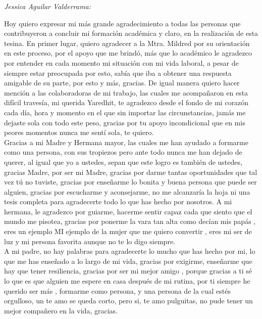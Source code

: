 \documentclass[12pt,letterpaper,spanish, xcolor=table]{report}
\numberwithin{figure}{subsection}
\newenvironment{dedication}{\newpage\large\null\em\vskip1in}%
{\vfill}
\begin{document}
		\begin{dedication}
			Jessica Aguilar Valderrama:
			
			Hoy quiero expresar mi más grande agradecimiento a todas las personas que contribuyeron a concluir mi formación académica y claro, en la realización de esta tesina. En primer lugar, quiero agradecer a la Mtra. Mildred por su orientación en este proceso, por el apoyo que me brindó, más que lo académico le agradezco por entender en cada momento mi situación con mi vida laboral, a pesar de siempre estar preocupada por esto, sabía que iba a obtener una respuesta amigable de su parte, por esto y más, gracias. De igual manera quiero hacer mención a las colaboradoras de mi trabajo, las cuales me acompañaron en esta difícil travesía, mi querida Yaredhit, te agradezco desde el fondo de mi corazón cada día, hora y momento en el que sin importar las circunstancias, jamás me dejaste sola con todo este peso, gracias por tu apoyo incondicional que en mis peores momentos nunca me sentí sola, te quiero.\\
			
			Gracias a mi Madre y Hermana mayor, las cuales me han ayudado a formarme como una persona, con sus tropiezos pero ante todo nunca me han dejado de querer, al igual que yo a ustedes, sepan que este logro es también de ustedes, gracias Madre, por ser mi Madre, gracias por darme tantas oportunidades que tal vez tú no tuviste, gracias por enseñarme lo bonita y buena persona que puede ser alguien, gracias por escucharme y aconsejarme, no me alcanzaría la hoja ni una tesis completa para agradecerte todo lo que has hecho por nosotros. A mi hermana, le agradezco por guiarme, hacerme sentir capaz cada que siento que el mundo me pisotea, gracias por ponerme la vara tan alta como decían mis papás , eres un ejemplo MI ejemplo de la mujer que me quiero convertir , eres mi ser de luz y mi persona favorita aunque no te lo digo siempre.\\
			
			A mi padre, no hay palabras para agradecerte lo mucho que has hecho por mi, lo que me has enseñado a lo largo de mi vida, gracias por exigirme, enseñarme que hay que tener resiliencia, gracias por ser mi mejor amigo , porque gracias a ti sé lo que es que alguien me espere en casa después de mi rutina, por ti siempre he querido ser más , formarme como persona, y una persona de la cual estés orgulloso, un te amo se queda corto, pero si, te amo pulguitas, no pude tener un mejor compañero en la vida, gracias.\\
			

\end{dedication}
\end{document}
